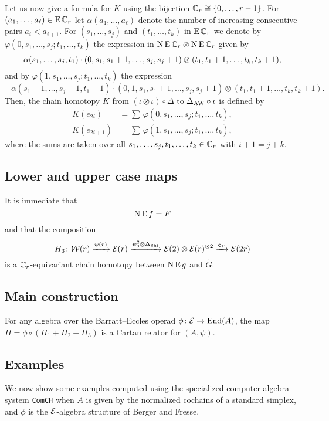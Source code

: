 Let us now give a formula for $K$ using the bijection $\mathbb{C}_r \cong \{0,\dots,r-1\}$.
For $(a_1,\dots,a_\ell) \in \operatorname{E}\mathbb{C}_r$ let $\alpha(a_1,\dots,a_\ell)$ denote the number of increasing consecutive pairs $a_i < a_{i+1}$.
For $(s_1,\dots,s_j)$ and $(t_1,\dots,t_k)$ in $\operatorname{E}\mathbb{C}_r$ we denote by $\varphi(0,s_1,\dots,s_j;t_1,\dots,t_k)$ the expression in $\operatorname{N} \operatorname{E} \mathbb{C}_r \otimes \operatorname{N} \operatorname{E} \mathbb{C}_r$ given by
\[
\alpha(s_1,\dots,s_j,t_1) \cdot
(0,s_1,s_1+1,\dots,s_j,s_j+1) \otimes
(t_1,t_1+1,\dots,t_k,t_k+1),
\]
and by $\varphi(1,s_1,\dots,s_j;t_1,\dots,t_k)$ the expression
\begin{equation*}
	- \alpha(s_1-1,\dots,s_j-1,t_1-1) \cdot
	(0,1,s_1,s_1+1,\dots,s_j,s_j+1)\otimes (t_1,t_1+1,\dots,t_k,t_k+1).
\end{equation*}
Then, the chain homotopy $K$ from $(\iota\otimes \iota) \circ \Delta$ to $\Delta_{\operatorname{AW}}\circ \iota$ is defined by
\[
\begin{split}
	K(e_{2i})   &= \sum \, \varphi(0,s_1,\dots,s_j;t_1,\dots,t_k), \\
	K(e_{2i+1}) &= \sum \, \varphi(1,s_1,\dots,s_j;t_1,\dots,t_k),
\end{split}
\]
where the sums are taken over all $s_1,\dots,s_j,t_1,\dots,t_k \in \mathbb{C}_r$ with $i+1 = j+k$.

\subsection{Lower and upper case maps}

It is immediate that
\[
\operatorname{N}\operatorname{E} f = F
\]
and that the composition
\[
H_3 \colon \mathcal{W}(r) \xrightarrow{\psi(r)} \mathcal{E}(r) \xrightarrow{\psi^2_0 \otimes \Delta_{\operatorname{Shi}}} \mathcal{E}(2) \otimes \mathcal{E}(r)^{\otimes 2} \xrightarrow{\bm{\circ}_{\mathcal{E}}} \mathcal{E}(2r)
\]
is a $\mathbb{C}_r$-equivariant chain homotopy between $\operatorname{N}\operatorname{E} g$ and $\widetilde G$.


\subsection{Main construction}

\begin{theorem}
	For any algebra over the Barratt--Eccles operad $\phi \colon \mathcal{E} \to \mathrm{End}(A)$, the map $H = \phi \circ (H_1 + H_2 + H_3)$ is a Cartan relator for $(A,\psi)$.
\end{theorem}

\subsection{Examples}

We now show some examples computed using the specialized computer algebra system \texttt{ComCH} \cite{medina2021comch} when $A$ is given by the normalized cochains of a standard simplex, and $\phi$ is the $\mathcal{E}$-algebra structure of Berger and Fresse.
